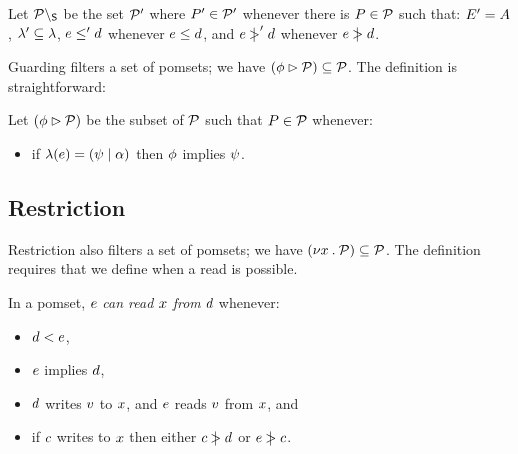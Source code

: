 \begin{definition}
Let $\mathcal{P}\setminus_{\mathsf{S}}$ be the set $\mathcal{P}'$ where $P'\in\mathcal{P}'$ whenever
there is $P\in\mathcal{P}$ such that:
$E' = A$,
$\lambda'\subseteq\lambda$,
$e\le'd$ whenever $e\le d$, and
$e\mathrel{\,\mid\!\!\!>}'d$ whenever $e\mathrel{\,\mid\!\!\!>}d$.
\end{definition}

Guarding filters a set of pomsets; we have
$(\phi\mathbin\rhd\mathcal{P})\subseteq\mathcal{P}$.
The definition is straightforward:
\begin{definition}
Let $(\phi \mathbin\rhd \mathcal{P})$ be the subset of $\mathcal{P}$ such that $P\in\mathcal{P}$ whenever:
\begin{itemize}
\item if $\lambda(e) = (\psi \mid \alpha)$ then $\phi$ implies $\psi$.
\end{itemize}
\end{definition}




\subsection{Restriction}
\label{sec:semi:restriction}

Restriction also filters a set of pomsets; we have
$(\nu x\mathbin.\mathcal{P})\subseteq\mathcal{P}$.  The definition requires that we define
when a read is possible.

\begin{definition}\label{def:semi:rf}
  In a pomset, $e$ \emph{can read $x$ from} $d$ whenever: 
  \begin{itemize}
  \item $d < e$,
  \item $e$ implies $d$,
  \item $d$ writes $v$ to $x$,
    and $e$ reads $v$ from $x$, and
  \item if $c$ writes to $x$
    then either $c \mathrel{\,\mid\!\!\!>} d$ or $e \mathrel{\,\mid\!\!\!>} c$.
  \end{itemize}
\end{definition}

